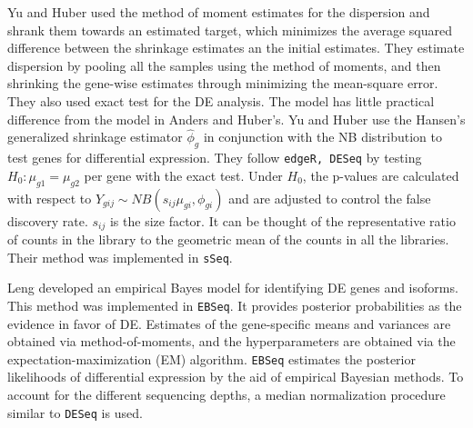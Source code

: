 Yu and Huber used the method of moment estimates for the dispersion and shrank them towards an estimated target, which minimizes the average squared difference between the shrinkage estimates an the initial estimates. They estimate dispersion by pooling all the samples using the method of moments, and then shrinking the gene-wise estimates through minimizing the mean-square error. They also used exact test for the DE analysis. The model has little practical difference from the model in Anders and Huber's. Yu and Huber use the Hansen's generalized shrinkage estimator $\hat{\phi}_g$ in conjunction with the NB distribution to test genes for differential expression. They follow {\tt edgeR, DESeq} by testing $H_{0}: \mu_{g1} = \mu_{g2}$ per gene with the exact test. Under $H_{0}$, the p-values are calculated with respect to $Y_{gij} {\sim} NB(s_{ij}\mu_{gi}, \phi_{gi})$ and are adjusted to control the false discovery rate\citep{yu2013sseq}. $s_{ij}$ is the size factor. It can be thought of the representative ratio of counts in the library to the geometric mean of the counts in all the libraries. Their method was implemented in {\tt sSeq}.


Leng developed an empirical Bayes model for identifying DE genes and isoforms. This method was implemented in {\tt EBSeq}. It provides posterior probabilities as the evidence in favor of DE. Estimates of the gene-specific means and variances are obtained via method-of-moments, and the hyperparameters are obtained via the expectation-maximization (EM) algorithm\citep{leng2013ebseq}. {\tt EBSeq} estimates the posterior likelihoods of differential expression by the aid of empirical Bayesian methods. To account for the different sequencing depths, a median normalization procedure similar to {\tt DESeq} is used. 